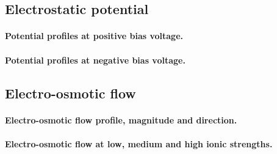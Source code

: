 \documentclass[journal=ancac3, manuscript=article, etalmode=truncate,maxauthors=0]{achemso}
\begin{document}
%

\subsection{Electrostatic potential}

\paragraph{Potential profiles at positive bias voltage.}
\paragraph{Potential profiles at negative bias voltage.}




\subsection{Electro-osmotic flow}


\paragraph{Electro-osmotic flow profile, magnitude and direction.}
\paragraph{Electro-osmotic flow at low, medium and high ionic strengths.}
\end{document}

